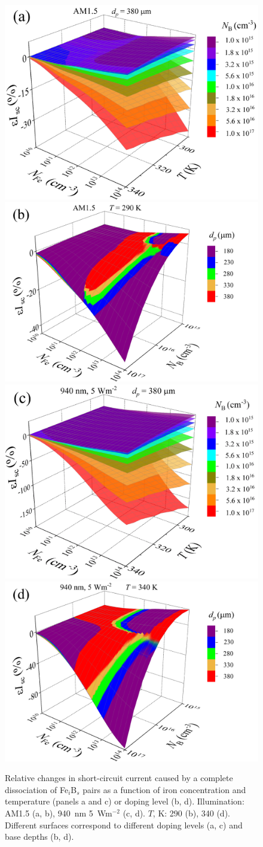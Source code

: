 \documentclass[a4paper,fleqn]{cas-sc}
\begin{document}
\begin{figure}
	\centering
     \includegraphics[width=0.49\linewidth]{Fig3a.png}
     \includegraphics[width=0.49\linewidth]{Fig3b.png}
     \includegraphics[width=0.49\linewidth]{Fig3c.png}
     \includegraphics[width=0.49\linewidth]{Fig3d.png}
	  \caption{Relative changes in short-circuit current caused by a complete
       dissociation of Fe$_i$B$_s$ pairs as a function of
       iron concentration and
       temperature (panels a and c) or doping level (b, d).
       Illumination: AM1.5 (a, b), 940~nm 5~Wm$^{-2}$ (c, d).
       $T$, K: 290 (b), 340 (d).
       Different surfaces correspond to different doping levels (a, c) and base depths (b, d).
}\label{fig3}
\end{figure}
\end{document}
